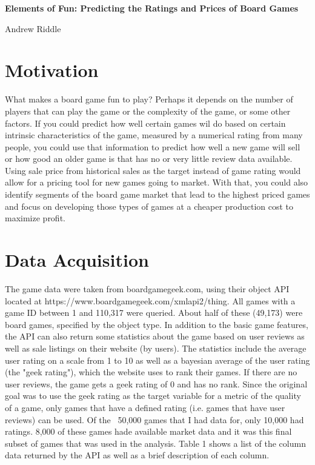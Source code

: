 \documentclass[12pt]{article}
\begin{document}
\begin{center}
\textbf{Elements of Fun: Predicting the Ratings and Prices of Board Games}

Andrew Riddle
\end{center}

\section{Motivation}
What makes a board game fun to play? Perhaps it depends on the number of players that can play the game or the complexity of the game, or some other factors. If you could predict how well certain games wil do based on certain intrinsic characteristics of the game, measured by a numerical rating from many people, you could use that information to predict how well a new game will sell or how good an older game is that has no or very little review data available. Using sale price from historical sales as the target instead of game rating would allow for a pricing tool for new games going to market. With that, you could also identify segments of the board game market that lead to the highest priced games and focus on developing those types of games at a cheaper production cost to maximize profit.

\section{Data Acquisition}
The game data were taken from boardgamegeek.com, using their object API located at https://www.boardgamegeek.com/xmlapi2/thing. All games with a game ID between 1 and 110,317 were queried. About half of these (49,173) were board games, specified by the object type. In addition to the basic game features, the API can also return some statistics about the game based on user reviews as well as sale listings on their website (by users). The statistics include the average user rating on a scale from 1 to 10 as well as a bayesian average of the user rating (the "geek rating"), which the website uses to rank their games. If there are no user reviews, the game gets a geek rating of 0 and has no rank. Since the original goal was to use the geek rating as the target variable for a metric of the quality of a game, only games that have a defined rating (i.e. games that have user reviews) can be used. Of the ~50,000 games that I had data for, only 10,000 had ratings. 8,000 of these games hade available market data and it was this final subset of games that was used in the analysis. Table 1 shows a list of the column data returned by the API as well as a brief description of each column. 
\end{document}
